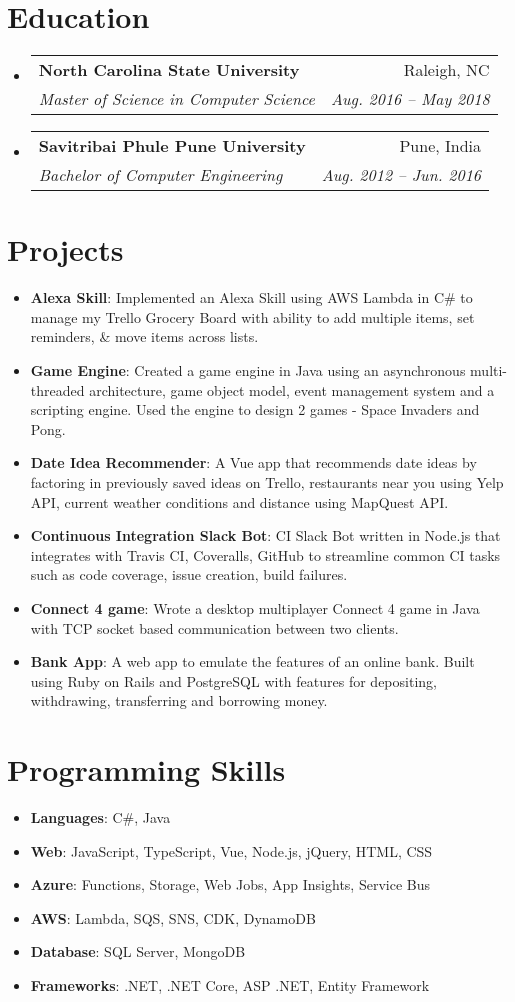 \documentclass[letterpaper,11pt]{article}
\makeatletter
\newcommand{\resumeItem}[2]{
  \item\small{
    \textbf{#1}{: #2 \vspace{-2pt}}
  }
}
\newcommand{\resumeSubheading}[4]{
  \vspace{-1pt}\item
    \begin{tabular*}{0.97\textwidth}[t]{l@{\extracolsep{\fill}}r}
      \textbf{#1} & #2 \\
      \textit{\small#3} & \textit{\small #4} \\
    \end{tabular*}\vspace{-5pt}
}
\newcommand{\resumeSubItem}[2]{\resumeItem{#1}{#2}\vspace{-4pt}}
\newcommand{\resumeSubHeadingListStart}{\begin{itemize}[leftmargin=*]}
\newcommand{\resumeSubHeadingListEnd}{\end{itemize}}
\makeatother
\begin{document}
\section{Education}
  \resumeSubHeadingListStart
    \resumeSubheading
      {North Carolina State University}{Raleigh, NC}
      {Master of Science in Computer Science}{Aug. 2016 -- May 2018}
    \resumeSubheading
      {Savitribai Phule Pune University}{Pune, India}
      {Bachelor of Computer Engineering}{Aug. 2012 -- Jun. 2016}
  \resumeSubHeadingListEnd


\section{Projects}
  \resumeSubHeadingListStart
    \resumeSubItem{Alexa Skill}
      {Implemented an Alexa Skill using AWS Lambda in C\# to manage my Trello Grocery Board with ability to add multiple items, set reminders, \& move items across lists. }
    \resumeSubItem{Game Engine}
      {Created a game engine in Java using an asynchronous multi-threaded architecture, game object model, event management system and a scripting engine. Used the engine to design 2 games - Space Invaders and Pong.}
    \resumeSubItem{Date Idea Recommender}
      {A Vue app that recommends date ideas by factoring in previously saved ideas on Trello, restaurants near you using Yelp API, current weather conditions and distance using MapQuest API.}
    \resumeSubItem{Continuous Integration Slack Bot}
      {CI Slack Bot written in Node.js that integrates with Travis CI, Coveralls, GitHub to streamline common CI tasks such as code coverage, issue creation, build failures.}
    \resumeSubItem{Connect 4 game}
      {Wrote a desktop multiplayer Connect 4 game in Java with TCP socket based communication between two clients.}
    \resumeSubItem{Bank App}
      {A web app to emulate the features of an online bank. Built using Ruby on Rails and PostgreSQL with features for depositing, withdrawing, transferring and borrowing money.}
  \resumeSubHeadingListEnd

%
\section{Programming Skills}
  \resumeSubHeadingListStart
    \resumeSubItem{Languages}{C\#, Java}
    \resumeSubItem{Web}{JavaScript, TypeScript, Vue, Node.js, jQuery, HTML, CSS}   
    \resumeSubItem{Azure}{Functions, Storage, Web Jobs, App Insights, Service Bus}
    \resumeSubItem{AWS}{Lambda, SQS, SNS, CDK, DynamoDB}
    \resumeSubItem{Database}{SQL Server, MongoDB}
    \resumeSubItem{Frameworks}{.NET, .NET Core, ASP .NET, Entity Framework}   
\resumeSubHeadingListEnd


\end{document}
